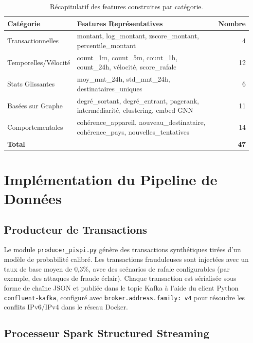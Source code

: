 \documentclass[12pt,a4paper,oneside]{book}
\theoremstyle{definition}
\theoremstyle{plain}
\begin{document}
\begin{table}[H]
  \centering
  \caption{Récapitulatif des features construites par catégorie.}
  \label{tab:features}
  \begin{tabularx}{\linewidth}{lXr}
    \toprule
    \textbf{Catégorie} & \textbf{Features Représentatives} & \textbf{Nombre} \\
    \midrule
    Transactionnelles    & montant, log\_montant, zscore\_montant, percentile\_montant & 4 \\
    Temporelles/Vélocité & count\_1m, count\_5m, count\_1h, count\_24h, vélocité, score\_rafale & 12 \\
    Stats Glissantes     & moy\_mnt\_24h, std\_mnt\_24h, destinataires\_uniques & 6 \\
    Basées sur Graphe    & degré\_sortant, degré\_entrant, pagerank, intermédiarité, clustering, embed GNN & 11 \\
    Comportementales     & cohérence\_appareil, nouveau\_destinataire, cohérence\_pays, nouvelles\_tentatives & 14 \\
    \midrule
    \textbf{Total}       & & \textbf{47} \\
    \bottomrule
  \end{tabularx}
\end{table}

\section{Implémentation du Pipeline de Données}

\subsection{Producteur de Transactions}

Le module \texttt{producer\_pispi.py} génère des transactions synthétiques tirées d'un modèle de probabilité calibré. Les transactions frauduleuses sont injectées avec un taux de base moyen de 0,3\%, avec des scénarios de rafale configurables (par exemple, des attaques de fraude éclair). Chaque transaction est sérialisée sous forme de chaîne JSON et publiée dans le topic Kafka à l'aide du client Python \texttt{confluent-kafka}, configuré avec \texttt{broker.address.family: v4} pour résoudre les conflits IPv6/IPv4 dans le réseau Docker.

\subsection{Processeur Spark Structured Streaming}
\end{document}
